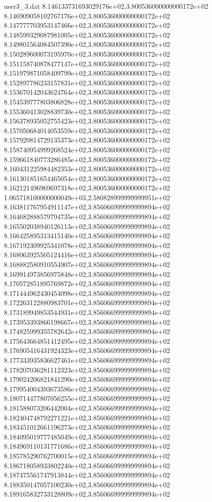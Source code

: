 \begin{filecontents}{user3_3.dat}
8.146133731693029176e+02,3.800536000000000172e+02
8.146909058102767176e+02,3.800536000000000172e+02
8.147777703953147466e+02,3.800536000000000172e+02
8.148599329087981005e+02,3.800536000000000172e+02
8.149801564084507390e+02,3.800536000000000172e+02
8.150289600073195970e+02,3.800536000000000172e+02
8.151158740878477147e+02,3.800536000000000172e+02
8.151979871058409799e+02,3.800536000000000172e+02
8.152897786233157831e+02,3.800536000000000172e+02
8.153670142043624764e+02,3.800536000000000172e+02
8.154539777803806828e+02,3.800536000000000172e+02
8.155360413028839730e+02,3.800536000000000172e+02
8.156378935052755423e+02,3.800536000000000172e+02
8.157050684014053559e+02,3.800536000000000172e+02
8.157920814729135373e+02,3.800536000000000172e+02
8.158740954999268524e+02,3.800536000000000172e+02
8.159661840773286485e+02,3.800536000000000172e+02
8.160431225984482353e+02,3.800536000000000172e+02
8.161301851654465054e+02,3.800536000000000172e+02
8.162121496969697318e+02,3.800536000000000172e+02
1.065718100000000049e+03,2.580828999999999951e+02
8.163811767954911147e+02,3.856066999999999894e+02
8.164682888579794735e+02,3.856066999999999894e+02
8.165502038940126113e+02,3.856066999999999894e+02
8.166425895313415140e+02,3.856066999999999894e+02
8.167192309925341078e+02,3.856066999999999894e+02
8.168063925505124416e+02,3.856066999999999894e+02
8.168882580910554907e+02,3.856066999999999894e+02
8.169914973856975848e+02,3.856066999999999894e+02
8.170572851895769872e+02,3.856066999999999894e+02
8.171444962430454098e+02,3.856066999999999894e+02
8.172263122880983701e+02,3.856066999999999894e+02
8.173189949853544931e+02,3.856066999999999894e+02
8.173953393866198667e+02,3.856066999999999894e+02
8.174825999355782642e+02,3.856066999999999894e+02
8.175643664851412495e+02,3.856066999999999894e+02
8.176905416431924323e+02,3.856066999999999894e+02
8.177333935836627461e+02,3.856066999999999894e+02
8.178207036281112323e+02,3.856066999999999894e+02
8.179024206821841290e+02,3.856066999999999894e+02
8.179954004393673586e+02,3.856066999999999894e+02
8.180714477807056255e+02,3.856066999999999894e+02
8.181588073206442004e+02,3.856066999999999894e+02
8.182404748792271221e+02,3.856066999999999894e+02
8.183451012661196273e+02,3.856066999999999894e+02
8.184095019777485049e+02,3.856066999999999894e+02
8.184969110131771686e+02,3.856066999999999894e+02
8.185785290762700015e+02,3.856066999999999894e+02
8.186718058933802240e+02,3.856066999999999894e+02
8.187475561747913844e+02,3.856066999999999894e+02
8.188350147057100230e+02,3.856066999999999894e+02
8.189165832733128809e+02,3.856066999999999894e+02

\end{filecontents}
